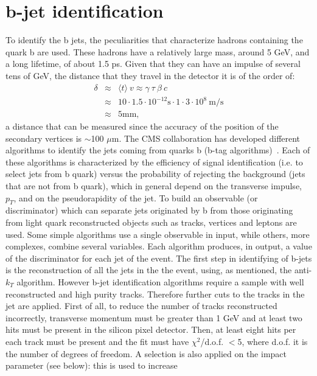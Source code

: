 \section{b-jet identification}
To identify the b jets, the peculiarities that characterize hadrons
containing the quark b are used.
These hadrons have a relatively large mass, around 5 GeV, and a long lifetime, of about 1.5 ps. Given that they can
have an impulse of several tens of GeV, the distance that they travel in the detector
it is of the order of:
\begin{eqnarray}
  \delta &\approx& \langle t \rangle \: v \approx \gamma \: \tau \: \beta  \: c  \nonumber \\
 &\approx& 10 \cdot 1.5 \cdot 10^{-12} \mbox{s} \cdot 1 \cdot 3 \cdot 10^8 \: \mbox{m/s}   \nonumber \\
 &\approx& 5  \mbox{mm,} \end{eqnarray}
a distance that can be measured since the accuracy of the position of the
secondary vertices is $\sim$100 $\mu$m.
The CMS collaboration has developed different algorithms to identify the jets coming from
  quarks b (b-tag algorithms)~\cite{Chatrchyan:2012jua}. Each of these algorithms is characterized
by the efficiency of signal identification (i.e. to select jets from b quark) versus the probability of
rejecting the background (jets that are not from b quark), which in general depend on the transverse impulse,
$p_T$, and on the pseudorapidity of the jet. To build an observable (or discriminator) which can separate 
jets originated by b from those originating from light quark 
reconstructed objects such as tracks, vertices and leptons are used.
Some simple algorithms use a single observable in input, while others,
more complexes, combine several variables. Each algorithm
produces, in output, a value of the discriminator for each jet of the event.
The first step in identifying of b-jets is the reconstruction of all the jets in the
the event, using, as mentioned, the anti-$k_T$ algorithm. However b-jet
identification algorithms require a sample with well reconstructed and high purity tracks.
Therefore further cuts to the tracks in the jet are applied. First of all, to reduce
the number of tracks reconstructed incorrectly, transverse momentum must be 
greater than 1 GeV and at least two hits must be present in the silicon pixel detector. Then, at 
least eight hits per each track must be present and the fit must have 
 $\chi^2$/d.o.f. $<$5, where d.o.f. it is the number of degrees of freedom.
A selection is also applied on the impact parameter (see below): this is used to increase
